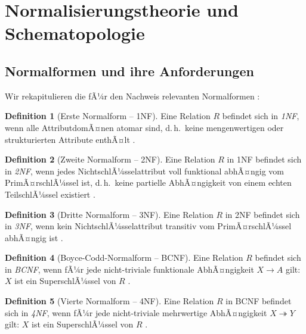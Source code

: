 ﻿\documentclass[12pt,a4paper]{article}
\theoremstyle{definition}
\newtheorem{definition}{Definition}[section]
\theoremstyle{remark}
\begin{document}
\section{Normalisierungstheorie und Schematopologie}
\label{sec:normalformen}

\subsection{Normalformen und ihre Anforderungen}

Wir rekapitulieren die fÃ¼r den Nachweis relevanten Normalformen \cite{Codd1974, Fagin1977}:

\begin{definition}[Erste Normalform -- 1NF]
Eine Relation $R$ befindet sich in \emph{1NF}, wenn alle AttributdomÃ¤nen
atomar sind, d.\,h.\ keine mengenwertigen oder strukturierten Attribute
enthÃ¤lt \cite{Codd1970}.
\end{definition}

\begin{definition}[Zweite Normalform -- 2NF]
Eine Relation $R$ in 1NF befindet sich in \emph{2NF}, wenn jedes
NichtschlÃ¼sselattribut voll funktional abhÃ¤ngig vom PrimÃ¤rschlÃ¼ssel ist,
d.\,h.\ keine partielle AbhÃ¤ngigkeit von einem echten TeilschlÃ¼ssel existiert
\cite{Codd1974}.
\end{definition}

\begin{definition}[Dritte Normalform -- 3NF]
Eine Relation $R$ in 2NF befindet sich in \emph{3NF}, wenn kein
NichtschlÃ¼sselattribut transitiv vom PrimÃ¤rschlÃ¼ssel abhÃ¤ngig ist
\cite{Codd1974}.
\end{definition}

\begin{definition}[Boyce-Codd-Normalform -- BCNF]
Eine Relation $R$ befindet sich in \emph{BCNF}, wenn fÃ¼r jede
nicht-triviale funktionale AbhÃ¤ngigkeit $X \to A$ gilt: $X$ ist ein
SuperschlÃ¼ssel von $R$ \cite{Boyce1974}.
\end{definition}

\begin{definition}[Vierte Normalform -- 4NF]
Eine Relation $R$ in BCNF befindet sich in \emph{4NF}, wenn fÃ¼r jede
nicht-triviale mehrwertige AbhÃ¤ngigkeit $X \twoheadrightarrow Y$ gilt:
$X$ ist ein SuperschlÃ¼ssel von $R$ \cite{Fagin1977}.
\end{definition}
\end{document}
